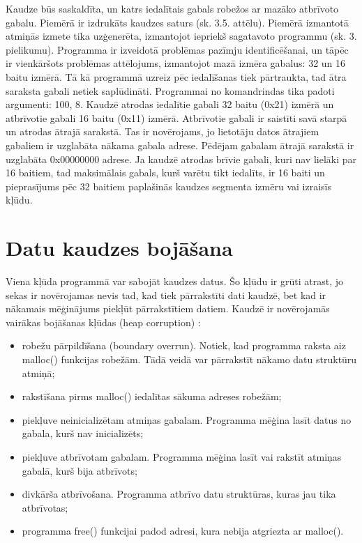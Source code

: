 Kaudze būs saskaldīta, un katrs iedalītais gabals robežos ar mazāko atbrīvoto gabalu.
Piemērā ir izdrukāts kaudzes saturs (sk. 3.5. attēlu).
Piemērā izmantotā atmiņās izmete tika uzģenerēta, izmantojot iepriekš sagatavoto programmu (sk. 3. pielikumu).
Programma ir izveidotā problēmas pazīmju identificēšanai, un tāpēc ir vienkāršots problēmas attēlojums, izmantojot mazā izmēra gabalus: 32 un 16 baitu izmērā.
Tā kā programmā uzreiz pēc iedalīšanas tiek pārtraukta, tad ātra saraksta gabali netiek saplūdināti.
Programmai no komandrindas tika padoti argumenti: 100, 8.
Kaudzē atrodas iedalītie gabali 32 baitu (0x21) izmērā un atbrīvotie gabali 16 baitu (0x11) izmērā.
Atbrīvotie gabali ir saistīti savā starpā un atrodas ātrajā sarakstā.
Tas ir novērojams, jo lietotāju datos ātrajiem gabaliem ir uzglabāta nākama gabala adrese.
Pēdējam gabalam ātrajā sarakstā ir uzglabāta 0x00000000 adrese.
Ja kaudzē atrodas brīvie gabali, kuri nav lielāki par 16 baitiem, tad maksimālais gabals, kurš varētu tikt iedalīts, ir 16 baiti un pieprasījums pēc 32 baitiem paplašinās kaudzes segmenta izmēru vai izraisīs kļūdu.

\section{Datu kaudzes bojāšana}

Viena kļūda programmā var sabojāt kaudzes datus. 
Šo kļūdu ir grūti atrast, jo sekas ir novērojamas nevis tad, kad tiek pārrakstīti dati kaudzē, bet kad ir nākamais mēģinājums piekļūt pārrakstītiem datiem.
Kaudzē ir novērojamās vairākas bojāšanas kļūdas (heap corruption) \cite{DHC}:
\begin{itemize}
\item robežu pārpildīšana (boundary overrun). Notiek, kad programma raksta aiz malloc() funkcijas robežām.
Tādā veidā var pārrakstīt nākamo datu struktūru atmiņā; 
\item rakstīšana pirms malloc() iedalītas sākuma adreses robežām;
\item piekļuve neinicializētam atmiņas gabalam. Programma mēģina lasīt datus no gabala, kurš nav inicializēts;
\item piekļuve atbrīvotam gabalam. Programma mēģina lasīt vai rakstīt atmiņas gabalā, kurš bija atbrīvots;
\item divkārša atbrīvošana. Programma atbrīvo datu struktūras, kuras jau tika atbrīvotas;
\item programma free() funkcijai padod adresi, kura nebija atgriezta ar malloc().
\end{itemize}



